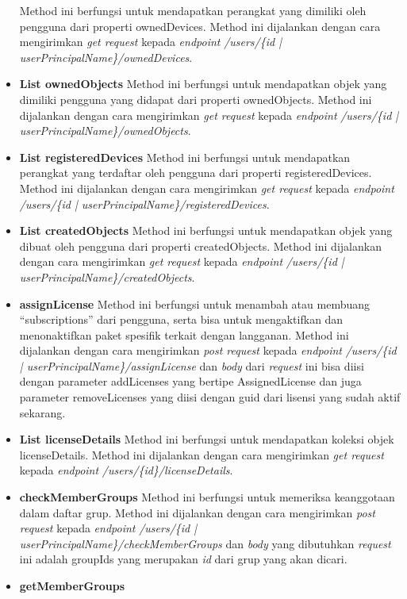 \begin{itemize}
	Method ini berfungsi untuk mendapatkan perangkat yang dimiliki oleh pengguna dari properti ownedDevices. Method ini dijalankan dengan cara mengirimkan \textit{get request} kepada \textit{endpoint} \textit{/users/\{id | userPrincipalName\}/ownedDevices}.
	\item \textbf{List ownedObjects}
	Method ini berfungsi untuk mendapatkan objek yang dimiliki pengguna yang didapat dari properti ownedObjects. Method ini dijalankan dengan cara mengirimkan \textit{get request} kepada \textit{endpoint} \textit{/users/\{id | userPrincipalName\}/ownedObjects}.
	\item \textbf{List registeredDevices}
	Method ini berfungsi untuk mendapatkan perangkat yang terdaftar oleh pengguna dari properti registeredDevices. Method ini dijalankan dengan cara mengirimkan \textit{get request} kepada \textit{endpoint} \textit{/users/\{id | userPrincipalName\}/registeredDevices}.
	\item \textbf{List createdObjects}
	Method ini berfungsi untuk mendapatkan objek yang dibuat oleh pengguna dari properti createdObjects. Method ini dijalankan dengan cara mengirimkan \textit{get request} kepada \textit{endpoint} \textit{/users/\{id | userPrincipalName\}/createdObjects}.
	\item \textbf{assignLicense}
	Method ini berfungsi untuk menambah atau membuang ``subscriptions'' dari pengguna, serta bisa untuk mengaktifkan dan menonaktifkan paket spesifik terkait dengan langganan. Method ini dijalankan dengan cara mengirimkan \textit{post request} kepada \textit{endpoint} \textit{/users/\{id | userPrincipalName\}/assignLicense} dan \textit{body} dari \textit{request} ini bisa diisi dengan parameter addLicenses yang bertipe AssignedLicense dan juga parameter removeLicenses yang diisi dengan guid dari lisensi yang sudah aktif sekarang.
	\item \textbf{List licenseDetails}
	Method ini berfungsi untuk mendapatkan koleksi objek licenseDetails. Method ini dijalankan dengan cara mengirimkan \textit{get request} kepada \textit{endpoint} \textit{/users/\{id\}/licenseDetails}.
	\item \textbf{checkMemberGroups}
	Method ini berfungsi untuk memeriksa keanggotaan dalam daftar grup. Method ini dijalankan dengan cara mengirimkan \textit{post request} kepada \textit{endpoint} \textit{/users/\{id | userPrincipalName\}/checkMemberGroups} dan \textit{body} yang dibutuhkan \textit{request} ini adalah groupIds yang merupakan \textit{id} dari grup yang akan dicari.
	\item \textbf{getMemberGroups}

\end{itemize}
